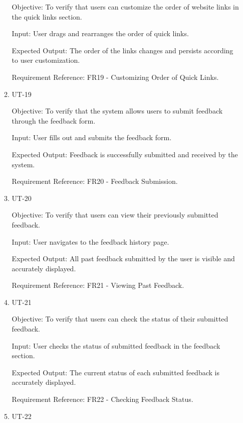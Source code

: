 \documentclass[12pt, titlepage]{article}
\begin{document}
\begin{enumerate}
\begin{enumerate}
        Objective: To verify that users can customize the order of website links in the quick links section.
        
        Input: User drags and rearranges the order of quick links.
        
        Expected Output: The order of the links changes and persists according to user customization.
        
        Requirement Reference: FR19 - Customizing Order of Quick Links.
        
    \item{UT-19\\}\label{UT-19}
    
        Objective: To verify that the system allows users to submit feedback through the feedback form.
        
        Input: User fills out and submits the feedback form.
        
        Expected Output: Feedback is successfully submitted and received by the system.
        
        Requirement Reference: FR20 - Feedback Submission.
        
    \item{UT-20\\}\label{UT-20}
    
        Objective: To verify that users can view their previously submitted feedback.
        
        Input: User navigates to the feedback history page.
        
        Expected Output: All past feedback submitted by the user is visible and accurately displayed.
        
        Requirement Reference: FR21 - Viewing Past Feedback.
        
    \item{UT-21\\}\label{UT-21}
    
        Objective: To verify that users can check the status of their submitted feedback.
        
        Input: User checks the status of submitted feedback in the feedback section.
        
        Expected Output: The current status of each submitted feedback is accurately displayed.
        
        Requirement Reference: FR22 - Checking Feedback Status.
        
    \item{UT-22\\}\label{UT-22}
    

\end{enumerate}
\end{enumerate}
\end{document}
